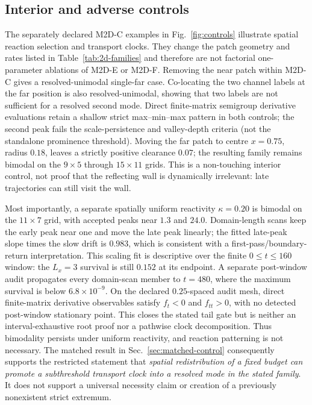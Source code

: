 \documentclass[aps,pre,reprint,amsmath,amssymb,longbibliography,floatfix]{revtex4-2}
\begin{document}
\subsection{Interior and adverse controls}
\label{sec:2d-controls}

The separately declared M2D-C examples in Fig.~\ref{fig:controls} illustrate
spatial reaction selection and transport clocks. They change the patch
geometry and rates listed in Table~\ref{tab:2d-families} and therefore are not
factorial one-parameter ablations of M2D-E or M2D-F. Removing the near patch
within M2D-C gives a resolved-unimodal single-far case. Co-locating the two
channel labels at the far position is also resolved-unimodal, showing that
two labels are not sufficient for a resolved second mode. Direct finite-matrix
semigroup derivative evaluations retain a shallow strict max--min--max pattern in both controls;
the second peak fails the scale-persistence and valley-depth criteria (not the
standalone prominence threshold). Moving the far
patch to centre \(x=0.75\), radius \(0.18\), leaves a strictly positive
clearance \(0.07\); the resulting family remains bimodal on the
\(9\times5\) through \(15\times11\) grids. This is a non-touching interior
control, not proof that the reflecting wall is dynamically irrelevant:
late trajectories can still visit the wall.

Most importantly, a separate spatially uniform reactivity
\(\kappa=0.20\) is bimodal on the \(11\times7\) grid, with accepted peaks
near \(1.3\) and \(24.0\). Domain-length scans keep the early peak near one
and move the late peak linearly; the fitted late-peak slope times the slow
drift is \(0.983\), which is consistent with a first-pass/boundary-return
interpretation. This scaling fit is descriptive over the finite
\(0\leq t\leq160\) window: the \(L_x=3\) survival is still \(0.152\) at its
endpoint. A separate post-window audit propagates every domain-scan member to
\(t=480\), where the maximum survival is below \(6.8\times10^{-9}\). On the declared
\(0.25\)-spaced audit mesh, direct finite-matrix derivative observables satisfy
\(f_t<0\) and \(f_{tt}>0\), with no detected post-window stationary point.
This closes the stated tail gate but is neither an interval-exhaustive root
proof nor a pathwise clock decomposition. Thus bimodality persists under
uniform reactivity, and reaction patterning is not necessary. The matched result in
Sec.~\ref{sec:matched-control} consequently supports the restricted statement
that \emph{spatial redistribution of a fixed budget can promote a subthreshold
transport clock into a resolved mode in the stated family}. It does not
support a universal necessity claim or creation of a previously nonexistent
strict extremum.
\end{document}

